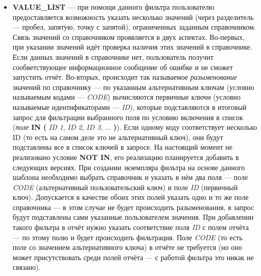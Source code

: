 \documentclass[../user-manual.tex]{subfiles}
\begin{document}
\begin{itemize}
		\item \textbf{VALUE\_LIST} --- при помощи данного фильтра пользователю предоставляется возможность указать несколько значений (через разделитель --- пробел, запятую, точку с запятой), ограниченных заданным справочником. Связь значений со справочником проявляется в двух аспектах. Во-первых, при указании значений идёт проверка наличия этих значений в справочнике. Если данных значений в справочнике нет, пользователь получит сообветствующее информационное сообщение об ошибке и не сможет запустить отчёт. Во-вторых, происходит так называемое \textit{разыменование} значений по справочнику --- по указанным альтернативным ключам (условно называемым кодами --- \textit{CODE}) вычисляются первичные ключи (условно называемые идентификаторами --- \textit{ID}), которые подставляются в итоговый запрос для фильтрации выбранного поля по условию включения в список (\textit{поле} \textbf{IN} \textbf{(} \textit{ ID 1}, \textit{ID 2}, \textit{ID 3}, ... \textbf{)}). Если одному коду соответствует несколько ID (то есть на самом деле это не альтернативный ключ), они будут подставлены все в список ключей в запросе. На настоящий момент не реализовано условие \textbf{NOT IN}, его реализацию планируется добавить в следующих версиях. При создании экземпляра фильтра на основе данного шаблона необходимо выбрать справочник и указать в нём два поля --- поле \textit{CODE} (альтернативный пользовательский ключ) и поле \textit{ID} (первичный ключ). Допускается в качестве обоих этих полей указать одно и то же поле справочника --- в этом случае не будет происходить разыменования, в запрос будут подставлены сами указанные пользователем значения. При добавлении такого фильтра в отчёт нужно указать соответствие поля \textit{ID} с полем отчёта --- по этому полю и будет происходить фильтрация. Поле \textit{CODE} (то есть поле со значением альтернативного ключа) в отчёте не требуется (но оно может присутствовать среди полей отчёта --- с работой фильтра это никак не связано).


\end{itemize}
\end{document}
